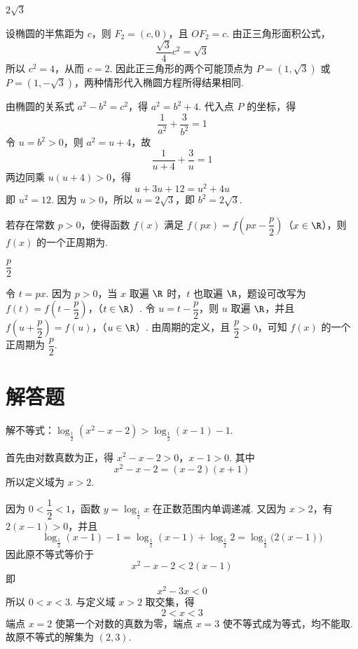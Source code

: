 \begin{answer}
\(2\sqrt3\)
\end{answer}

\begin{solution}
设椭圆的半焦距为 \(c\)，则 \(F_{2}=(c,0)\)，且 \(OF_{2}=c\). 由正三角形面积公式，
\[
\dfrac{\sqrt3}{4}c^2=\sqrt3
\]
所以 \(c^2=4\)，从而 \(c=2\). 因此正三角形的两个可能顶点为 \(P=(1,\sqrt3)\) 或 \(P=(1,-\sqrt3)\)，两种情形代入椭圆方程所得结果相同.

由椭圆的关系式 \(a^2-b^2=c^2\)，得 \(a^2=b^2+4\). 代入点 \(P\) 的坐标，得
\[
\dfrac1{a^2}+\dfrac3{b^2}=1
\]
令 \(u=b^2>0\)，则 \(a^2=u+4\)，故
\[
\dfrac1{u+4}+\dfrac3u=1
\]
两边同乘 \(u(u+4)>0\)，得
\[
u+3u+12=u^2+4u
\]
即 \(u^2=12\). 因为 \(u>0\)，所以 \(u=2\sqrt3\)，即 \(b^2=2\sqrt3\).
\end{solution}

\begin{problem}
若存在常数 \(p>0\)，使得函数 \(f(x)\) 满足 \(f(px)=f\left(px-\dfrac p2\right)\)（\(x\in\R\)），则 \(f(x)\) 的一个正周期为\fillinblank{}.
\end{problem}

\begin{answer}
\(\dfrac p2\)
\end{answer}

\begin{solution}
令 \(t=px\). 因为 \(p>0\)，当 \(x\) 取遍 \(\R\) 时，\(t\) 也取遍 \(\R\)，题设可改写为
\(f(t)=f\left(t-\dfrac p2\right)\)，（\(t\in\R\)）.
令 \(u=t-\dfrac p2\)，则 \(u\) 取遍 \(\R\)，并且
\(f\left(u+\dfrac p2\right)=f(u)\)，（\(u\in\R\)）.
由周期的定义，且 \(\dfrac p2>0\)，可知 \(f(x)\) 的一个正周期为 \(\dfrac p2\).
\end{solution}

\section{解答题}
\begin{problem}
解不等式：\(\log_{\frac12}(x^{2}-x-2)>\log_{\frac12}(x-1)-1\).
\end{problem}

\begin{solution}
首先由对数真数为正，得
\(x^2-x-2>0\)，\(x-1>0\).
其中
\[
x^2-x-2=(x-2)(x+1)
\]
所以定义域为 \(x>2\).

因为 \(0<\dfrac12<1\)，函数 \(y=\log_{\frac12}x\) 在正数范围内单调递减. 又因为 \(x>2\)，有 \(2(x-1)>0\)，并且
\[
\log_{\frac12}(x-1)-1
=\log_{\frac12}(x-1)+\log_{\frac12}2
=\log_{\frac12}\bigl(2(x-1)\bigr)
\]
因此原不等式等价于
\[
x^2-x-2<2(x-1)
\]
即
\[
x^2-3x<0
\]
所以 \(0<x<3\). 与定义域 \(x>2\) 取交集，得
\[
2<x<3
\]
端点 \(x=2\) 使第一个对数的真数为零，端点 \(x=3\) 使不等式成为等式，均不能取. 故原不等式的解集为 \((2,3)\).
\end{solution}

